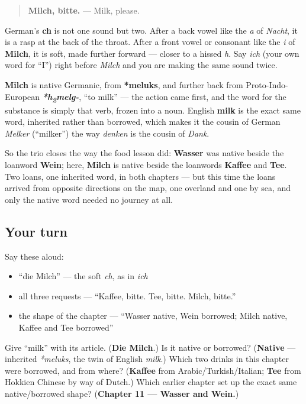 \begin{quote}
\textbf{Milch, bitte.} — Milk, please.
\end{quote}

\begin{sounds}
German's \textbf{ch} is not one sound but two. After a back vowel like the \emph{a} of \emph{Nacht}, it is a rasp at the back of the throat. After a front vowel or consonant like the \emph{i} of \textbf{Milch}, it is soft, made further forward — closer to a hissed \emph{h}. Say \emph{ich} (your own word for \textquotedblleft{}I\textquotedblright{}) right before \emph{Milch} and you are making the same sound twice.
\end{sounds}

\begin{cousinweb}
\textbf{Milch} is native Germanic, from \textbf{*meluks}, and further back from Proto-Indo-European \emph{\textbf{*h\textsubscript{2}melg-}}, \textquotedblleft{}to milk\textquotedblright{} — the action came first, and the word for the substance is simply that verb, frozen into a noun. English \textbf{milk} is the exact same word, inherited rather than borrowed, which makes it the cousin of German \emph{Melker} (\textquotedblleft{}milker\textquotedblright{}) the way \emph{denken} is the cousin of \emph{Dank}.

So the trio closes the way the food lesson did: \textbf{Wasser} was native beside the loanword \textbf{Wein}; here, \textbf{Milch} is native beside the loanwords \textbf{Kaffee} and \textbf{Tee}. Two loans, one inherited word, in both chapters — but this time the loans arrived from opposite directions on the map, one overland and one by sea, and only the native word needed no journey at all.
\end{cousinweb}

\subsection*{Your turn}
Say these aloud:

\begin{itemize}
\raggedright
  \item \textquotedblleft{}die Milch\textquotedblright{} — the soft \emph{ch}, as in \emph{ich}
  \item all three requests — \textquotedblleft{}Kaffee, bitte. Tee, bitte. Milch, bitte.\textquotedblright{}
  \item the shape of the chapter — \textquotedblleft{}Wasser native, Wein borrowed; Milch native, Kaffee and Tee borrowed\textquotedblright{}
\end{itemize}

\begin{tcolorbox}[breakable,colback=teal!4,colframe=teal!35!black,title={Before you move on}]
Give \textquotedblleft{}milk\textquotedblright{} with its article. (\textbf{Die Milch}.) Is it native or borrowed? (\textbf{Native} — inherited \emph{*meluks}, the twin of English \emph{milk}.) Which two drinks in this chapter were borrowed, and from where? (\textbf{Kaffee} from Arabic/Turkish/Italian; \textbf{Tee} from Hokkien Chinese by way of Dutch.) Which earlier chapter set up the exact same native/borrowed shape? (\textbf{Chapter 11 — Wasser and Wein.})
\end{tcolorbox}
